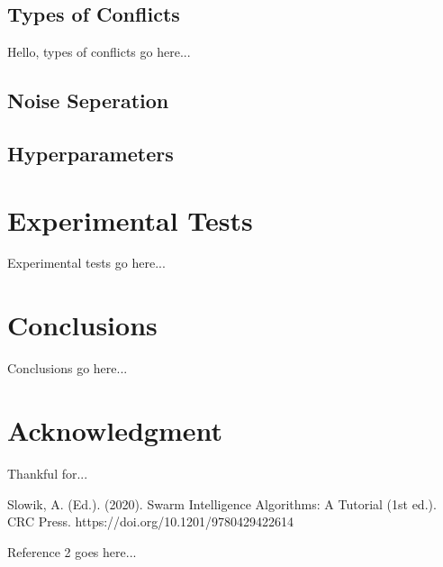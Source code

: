 \documentclass[conference]{IEEEtran}
\begin{document}
    \subsection{Types of Conflicts}
    Hello, types of conflicts go here...

    \subsection{Noise Seperation}


    \subsection{Hyperparameters}
    

\section{Experimental Tests}
Experimental tests go here...

\section{Conclusions}
Conclusions go here...

\section*{Acknowledgment}
Thankful for...

\begin{thebibliography}{1}
    
    
    Slowik, A. (Ed.). (2020). Swarm Intelligence Algorithms: A Tutorial (1st ed.). CRC Press. https://doi.org/10.1201/9780429422614
    
    Reference 2 goes here...
    
\end{thebibliography}
\end{document}
